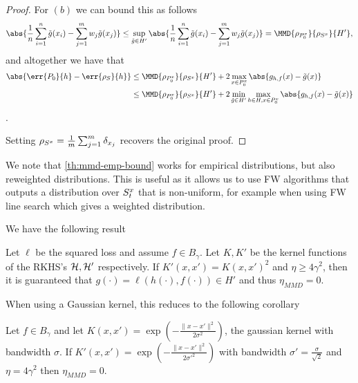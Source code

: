 \begin{proof}
  For \((b)\) we can bound this as follows
  \begin{equation*}
    \abs{\frac{1}{n} \sum_{i=1}^n\tilde{g}(x_i) - \sum_{j=1}^m w_j \tilde{g}(x_j)} \leq \sup_{\tilde{g} \in H'}\abs{\frac{1}{n} \sum_{i=1}^n \tilde{g}(x_i) - \sum_{j=1}^m w_j \tilde{g}(x_j)} = \MMD{\rho_{\poolsetx_0}}{\rho_{\trainsetx}}{H'},
  \end{equation*}
  and altogether we have that
  \begin{align*}
    \abs{\err{\poolset_0}{h} - \err{\rho_{\trainset}}{h}} & \leq \MMD{\rho_{\poolsetx_0}}{\rho_{\trainsetx}}{H'} + 2\max_{x \in \poolsetx_0}\abs{g_{h, f}(x) - \tilde{g}(x)} \\
                                                          & \leq \MMD{\rho_{\poolsetx_0}}{\rho_{\trainsetx}}{H'} + 2\min_{\tilde{g} \in H'}\max_{h \in H, x \in \poolsetx_0}\abs{g_{h, f}(x) - \tilde{g}(x)}
  \end{align*}.

  Setting \(\rho_{S^x} = \frac{1}{m}\sum_{j=1}^{m}\delta_{x_{j}}\) recovers the original proof.
\end{proof}

We note that \ref{th:mmd-emp-bound} works for empirical distributions, but also
reweighted distributions. This is useful as it allows us to use FW algorithms
that outputs a distribution over \(S^x_{t}\) that is non-uniform, for
example when using FW line search which gives a weighted distribution.

We have the following result
\begin{theorem}
  \label{thm:zero_eta_MMD}
  Let \(\ell\) be the squared loss and assume \(f \in B_{\gamma}\). Let \(K, K'\) be the
  kernel functions of the RKHS's \(\mathcal{H}, \mathcal{H}'\) respectively. If \(K'(x, x') =
  K(x, x')^2\) and \(\eta \geq 4\gamma^2\), then it is guaranteed that \(g(\cdot) =
  \ell(h(\cdot), f(\cdot)) \in H'\) and thus \(\eta_{MMD} = 0\).
\end{theorem}
When using a Gaussian kernel, this reduces to the following corollary
\begin{corollary}
  \label{cor:gauss-kernel-squared-gives-eta-zero}
  Let \(f \in B_{\gamma}\) and let \(K(x, x') = \exp(- \frac{\|x - x'\|^2}{2\sigma^2})\), the gaussian kernel with
  bandwidth \(\sigma\). If \(K'(x, x') = \exp(- \frac{\|x - x'\|^2}{2\sigma'^2})\) with bandwidth \(\sigma' =
  \frac{\sigma}{\sqrt{2}}\) and \(\eta = 4\gamma^2\) then \(\eta_{MMD} = 0\).
\end{corollary}

